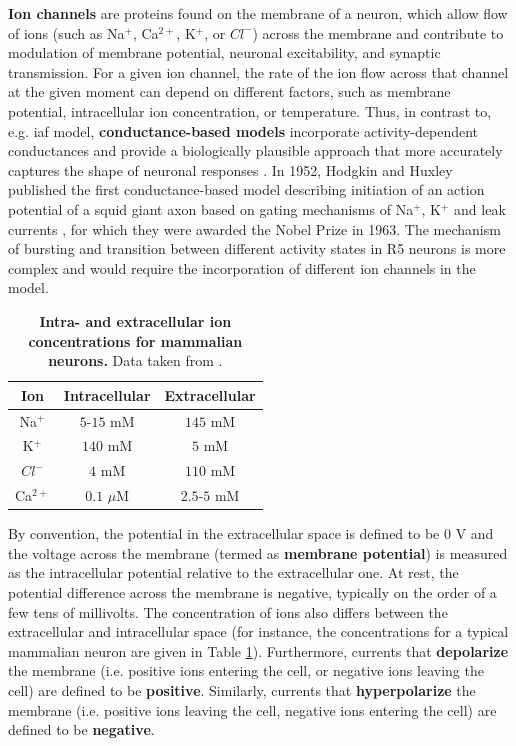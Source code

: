 \documentclass[../main.tex]{subfiles}
\begin{document}
\textbf{Ion channels} are proteins found on the membrane of a neuron, which allow flow of ions (such as Na$^+$, Ca$^{2+}$, K$^+$, or $Cl^-$) across the membrane and contribute to modulation of membrane potential, neuronal excitability, and synaptic transmission. For a given ion channel, the rate of the ion flow across that channel at the given moment can depend on different factors, such as membrane potential, intracellular ion concentration, or temperature. Thus, in contrast to, e.g. \gls{iaf} model, \textbf{conductance-based models} incorporate activity-dependent conductances and provide a biologically plausible approach that more accurately captures the shape of neuronal responses \parencite{destexheConductanceBasedIntegrateandFireModels1997}. In 1952, Hodgkin and Huxley published the first conductance-based model describing initiation of an action potential of a squid giant axon based on gating mechanisms of Na$^+$, K$^+$ and leak currents \parencite{hodgkinQuantitativeDescriptionMembrane1952}, for which they were awarded the Nobel Prize in 1963. The mechanism of bursting and transition between different activity states in R5 neurons is more complex and would require the incorporation of different ion channels in the model.

\begin{table}[!b]
    \centering
    \begin{tabular}{|c|c|c|}
        \hline
        Ion & Intracellular & Extracellular \\
        \hline
        \hline
        Na$^+$     & $5$-$15$ mM    & $145$ mM    \\
        K$^+$      & $140$ mM       & $5$ mM      \\
        $Cl^-$     & $4$ mM         & $110$ mM    \\
        Ca$^{2+}$  & $0.1$ $\mu$M   & $2.5$-$5$ mM \\
        \hline
    \end{tabular}
    \caption[Intra- and extracellular ion concentrations for mammalian neurons]{
        \textbf{Intra- and extracellular ion concentrations for mammalian neurons.}
        Data taken from \parencite{izhikevichDynamicalSystemsNeuroscience2006}.
    }
    \label{tab:typical_ion_concentrations_in_mammaly}
\end{table}

By convention, the potential in the extracellular space is defined to be $0$ V and the voltage across the membrane (termed as \textbf{membrane potential}) is measured as the intracellular potential relative to the extracellular one. At rest, the potential difference across the membrane is negative, typically on the order of a few tens of millivolts. The concentration of ions also differs between the extracellular and intracellular space (for instance, the concentrations for a typical mammalian neuron are given in Table \ref{tab:typical_ion_concentrations_in_mammaly}). Furthermore, currents that \textbf{depolarize} the membrane (i.e. positive ions entering the cell, or negative ions leaving the cell) are defined to be \textbf{positive}. Similarly, currents that \textbf{hyperpolarize} the membrane (i.e. positive ions leaving the cell, negative ions entering the cell) are defined to be \textbf{negative}.
\end{document}
